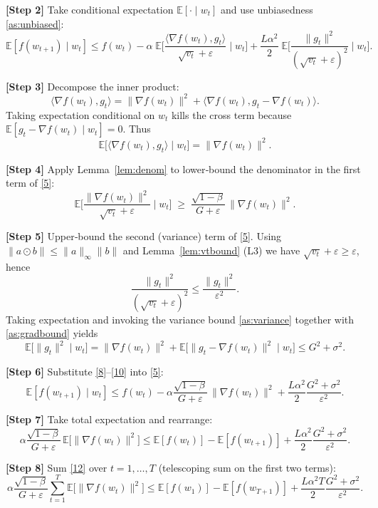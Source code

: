 \documentclass{article}
\begin{document}
\noindent\textbf{[Step 2]} Take conditional expectation $\mathbb{E}[\cdot\mid w_{t}]$ and use unbiasedness \ref{as:unbiased}:
\[
\mathbb{E}[f(w_{t+1})\mid w_{t}]
\le f(w_{t})
-\alpha\;\mathbb{E}\!\Big[\frac{\langle\nabla f(w_{t}),g_{t}\rangle}{\sqrt{v_{t}}+\varepsilon}\mid w_{t}\Big]
+\frac{L\alpha^{2}}{2}\;\mathbb{E}\!\Big[\frac{\|g_{t}\|^{2}}{(\sqrt{v_{t}}+\varepsilon)^{2}}\mid w_{t}\Big].
\tag{5}
\]

\noindent\textbf{[Step 3]} Decompose the inner product:
\[
\langle\nabla f(w_{t}),g_{t}\rangle
= \|\nabla f(w_{t})\|^{2}
+ \langle\nabla f(w_{t}),g_{t}-\nabla f(w_{t})\rangle .
\tag{6}
\]
Taking expectation conditional on $w_{t}$ kills the cross term because
$\mathbb{E}[g_{t}-\nabla f(w_{t})\mid w_{t}]=0$.
Thus
\[
\mathbb{E}\!\Big[\langle\nabla f(w_{t}),g_{t}\rangle\mid w_{t}\Big]
= \|\nabla f(w_{t})\|^{2}.
\tag{7}
\]

\noindent\textbf{[Step 4]} Apply Lemma~\ref{lem:denom} to lower‑bound the denominator in the first term of \eqref{5}:
\[
\mathbb{E}\!\Big[\frac{\|\nabla f(w_{t})\|^{2}}{\sqrt{v_{t}}+\varepsilon}\mid w_{t}\Big]
\;\ge\;
\frac{\sqrt{1-\beta}}{G+\varepsilon}\,\|\nabla f(w_{t})\|^{2}.
\tag{8}
\]

\noindent\textbf{[Step 5]} Upper‑bound the second (variance) term of \eqref{5}. Using $\|a\odot b\|\le\|a\|_{\infty}\|b\|$ and Lemma~\ref{lem:vtbound} (L3) we have $\sqrt{v_{t}}+\varepsilon\ge\varepsilon$, hence
\[
\frac{\|g_{t}\|^{2}}{(\sqrt{v_{t}}+\varepsilon)^{2}}
\le \frac{\|g_{t}\|^{2}}{\varepsilon^{2}}.
\tag{9}
\]
Taking expectation and invoking the variance bound \ref{as:variance} together with \ref{as:gradbound} yields
\[
\mathbb{E}\!\Big[\|g_{t}\|^{2}\mid w_{t}\Big]
= \|\nabla f(w_{t})\|^{2}+ \mathbb{E}\!\big[\|g_{t}-\nabla f(w_{t})\|^{2}\mid w_{t}\big]
\le G^{2}+\sigma^{2}.
\tag{10}
\]

\noindent\textbf{[Step 6]} Substitute \eqref{8}–\eqref{10} into \eqref{5}:
\[
\mathbb{E}[f(w_{t+1})\mid w_{t}]
\le f(w_{t})
-\alpha\frac{\sqrt{1-\beta}}{G+\varepsilon}\,\|\nabla f(w_{t})\|^{2}
+\frac{L\alpha^{2}}{2}\frac{G^{2}+\sigma^{2}}{\varepsilon^{2}}.
\tag{11}
\]

\noindent\textbf{[Step 7]} Take total expectation and rearrange:
\[
\alpha\frac{\sqrt{1-\beta}}{G+\varepsilon}\,
\mathbb{E}\big[\|\nabla f(w_{t})\|^{2}\big]
\le
\mathbb{E}[f(w_{t})]-\mathbb{E}[f(w_{t+1})]
+\frac{L\alpha^{2}}{2}\frac{G^{2}+\sigma^{2}}{\varepsilon^{2}}.
\tag{12}
\]

\noindent\textbf{[Step 8]} Sum \eqref{12} over $t=1,\dots,T$ (telescoping sum on the first two terms):
\[
\alpha\frac{\sqrt{1-\beta}}{G+\varepsilon}
\sum_{t=1}^{T}\mathbb{E}\big[\|\nabla f(w_{t})\|^{2}\big]
\le
\mathbb{E}[f(w_{1})]-\mathbb{E}[f(w_{T+1})]
+ \frac{L\alpha^{2}T}{2}\frac{G^{2}+\sigma^{2}}{\varepsilon^{2}}.
\tag{13}
\]
\end{document}
